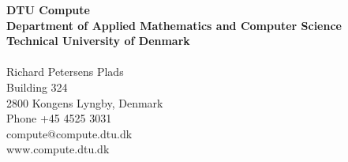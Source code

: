 \thispagestyle{empty} %
\frieze
\vspace*{\fill}
\noindent
\sffamily
\small
\textbf{DTU Compute}\\
\textbf{Department of Applied Mathematics and Computer Science}\\
\textbf{Technical University of Denmark}\\
\\
Richard Petersens Plads \\
Building 324\\
2800 Kongens Lyngby, Denmark\\
Phone +45 4525 3031\\
compute@compute.dtu.dk\\
www.compute.dtu.dk\\
\normalsize
\normalfont
\vspace*{2.5cm}

